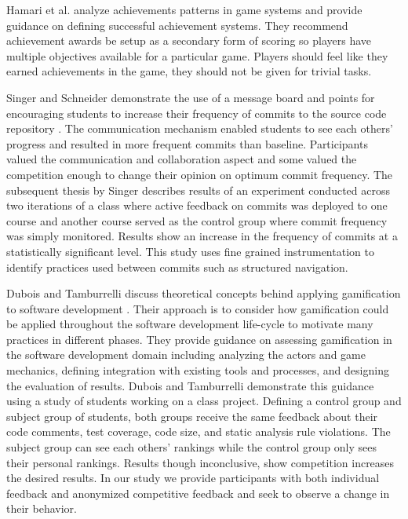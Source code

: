 \documentclass{sig-alternate}
\begin{document}
Hamari et al. analyze achievements patterns in game systems and provide guidance on defining successful achievement systems.  They recommend  achievement awards be setup as a secondary form of scoring so players have multiple objectives available for a particular game.  Players should feel like they earned achievements in the game, they should not be given for trivial tasks.

Singer and Schneider demonstrate the use of a message board and points for encouraging students to increase their frequency of commits to the source code repository \cite{Singer2012It}.  The communication mechanism enabled students to see each others' progress and resulted in more frequent commits than baseline.  Participants valued the communication and collaboration aspect and some valued the competition enough to change their opinion on optimum commit frequency.  The subsequent thesis by Singer \cite{Singer2013a} describes results of an experiment conducted across two iterations of a class where active feedback on commits was deployed to one course and another course served as the control group where commit frequency was simply monitored.  Results show an increase in the frequency of commits at a statistically significant level.  This study uses fine grained instrumentation to identify practices used between commits such as structured navigation.

Dubois and Tamburrelli discuss theoretical concepts behind applying gamification to software development \cite{Dubois2013Understanding}. Their approach is to consider how gamification could be applied throughout the software development life-cycle to motivate many practices in different phases.  They provide guidance on assessing gamification in the software development domain including analyzing the actors and game mechanics, defining integration with existing tools and processes, and designing the evaluation of results.  Dubois and Tamburrelli demonstrate this guidance using a study of students working on a class project.  Defining a control group and subject group of students, both groups receive the same feedback about their code comments, test coverage, code size, and static analysis rule violations.  The subject group can see each others' rankings while the control group only sees their personal rankings.  Results though inconclusive, show competition increases the desired results.  In our study we provide participants with both individual feedback and anonymized competitive feedback and seek to observe a change in their behavior.
\end{document}
